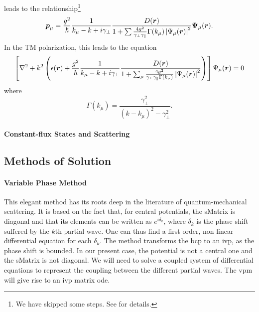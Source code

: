leads to the relationship\footnote{We have skipped some steps. See \cite[\S2.2]{GE2010b} for details.}
  \begin{equation}
   \boldsymbol{p}_\mu = \frac{g^2}{\hbar}\frac{1}{k_\mu-k+i\gamma_\perp}\frac{D(\boldsymbol{r})}{1+\sum\frac{4g^2}{\gamma_\perp\gamma_\parallel}\Gamma(k_\mu)\left|\Psi_\mu(\boldsymbol{r})\right|^2}\boldsymbol{\Psi}_\mu(\boldsymbol{r}).
  \end{equation}
In the TM polarization, this leads to the equation
  \begin{equation}
   \left[\nabla^2+k^2\left(\epsilon(\boldsymbol{r})+\frac{g^2}{\hbar}\frac{1}{k_\mu-k+i\gamma_\perp}\frac{D(\boldsymbol{r})}{1+\sum_\mu\frac{4g^2}{\gamma_\perp\gamma_\parallel\Gamma(k_\mu)}\left|\Psi_\mu(\boldsymbol{r})\right|^2}\right)\right]\Psi_\mu(\boldsymbol{r})=0
  \end{equation}
where
	\begin{equation}
		\Gamma(k_\mu) = \frac{\gamma_\perp^2}{(k-k_\mu)^2-\gamma_\perp^2}.
	\end{equation}

\paragraph{Constant-flux States and Scattering}


\subsection{Methods of Solution}
\paragraph{Variable Phase Method}
This elegant method has its roots deep in the literature of quantum-mechanical
scattering. It is based on the fact that, for central potentials, the 
\gls{sMatrix} is diagonal and that its elements can be written as
$e^{i\delta_k}$, where $\delta_k$ is the phase shift suffered by the 
$k$th partial wave. One can thus find a first order, non-linear differential
equation \cite{CAL1967} for each $\delta_k$. The method transforms the \gls{bcp} to an \gls{ivp}, as the phase shift
is bounded. In our present case, the potential is not a central one and the
\gls{sMatrix} is not diagonal. We will need to solve a coupled system 
of differential equations to represent the coupling between the different
partial waves. The \gls{vpm} will give rise to an \gls{ivp} matrix \gls{ode}.


